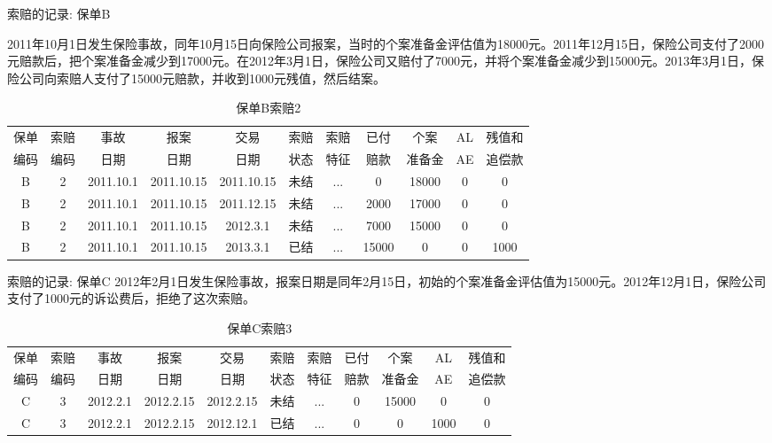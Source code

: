 \documentclass[professionalfont]{beamer}
\begin{document}
\begin{frame}{索赔的记录: 保单B}

	2011年10月1日发生保险事故，同年10月15日向保险公司报案，当时的个案准备金评估值为18000元。2011年12月15日，保险公司支付了2000元赔款后，把个案准备金减少到17000元。在2012年3月1日，保险公司又赔付了7000元，并将个案准备金减少到15000元。2013年3月1日，保险公司向索赔人支付了15000元赔款，并收到1000元残值，然后结案。
{\tiny \begin{table}[]
	\centering
	\caption{保单B索赔2}
	\label{my-label}
	\begin{tabular}{ccccccccccc}
		\hline
		保单 & 索赔 & 事故        & 报案         & 交易         & 索赔 & 索赔  & 已付    & 个案    & AL & 残值和  \\
		编码 & 编码 & 日期        & 日期         & 日期         & 状态 & 特征  & 赔款    & 准备金   &    AE                   & 追偿款  \\ \hline
		B  & 2  & 2011.10.1 & 2011.10.15 & 2011.10.15 & 未结 & ... & 0     & 18000 & 0                     & 0    \\
		B  & 2  & 2011.10.1 & 2011.10.15 & 2011.12.15 & 未结 & ... & 2000  & 17000 & 0                     & 0    \\
		B  & 2  & 2011.10.1 & 2011.10.15 & 2012.3.1   & 未结 & ... & 7000  & 15000 & 0                     & 0    \\
		B  & 2  & 2011.10.1 & 2011.10.15 & 2013.3.1   & 已结 & ... & 15000 & 0     & 0                     & 1000 \\ \hline
	\end{tabular}
\end{table}
	}

\end{frame}
\begin{frame}{索赔的记录: 保单C}
		2012年2月1日发生保险事故，报案日期是同年2月15日，初始的个案准备金评估值为15000元。2012年12月1日，保险公司支付了1000元的诉讼费后，拒绝了这次索赔。
{\tiny \begin{table}[]
	\centering
	\caption{保单C索赔3}
	\label{my-label}
	\begin{tabular}{ccccccccccc}
		\hline
		保单 & 索赔 & 事故       & 报案        & 交易        & 索赔 & 索赔  & 已付 & 个案    & AL & 残值和 \\
		编码 & 编码 & 日期       & 日期        & 日期        & 状态 & 特征  & 赔款 & 准备金   &   AE  & 追偿款 \\ \hline
		C  & 3  & 2012.2.1 & 2012.2.15 & 2012.2.15 & 未结 & ... & 0  & 15000 & 0                     & 0   \\
		C  & 3  & 2012.2.1 & 2012.2.15 & 2012.12.1 & 已结 & ... & 0  & 0     & 1000                  & 0   \\ \hline
	\end{tabular}
\end{table}	}
\end{frame}	
\end{document}
